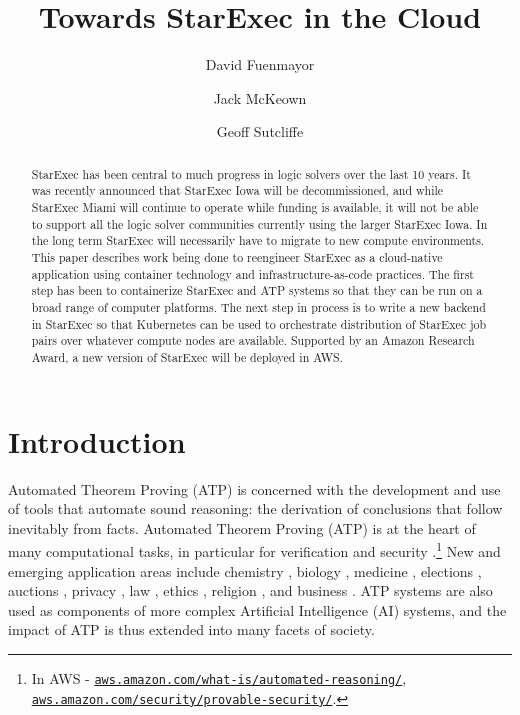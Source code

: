 \documentclass{easychair}
\title{Towards StarExec in the Cloud}
\author{
  David Fuenmayor\inst{1}
\and
  Jack McKeown\inst{2}
\and
  Geoff Sutcliffe\inst{2}
}
\institute{
  University of Bamberg,
  Bamberg, Germany\\
  \email{david.fuenmayor@uni-bamberg.de}
\and
  University of Miami,
  Miami, USA\\
  \email{jam771@miami.edu,geoff@cs.miami.edu}
}
\begin{document}
\maketitle

\begin{abstract}
StarExec has been central to much progress in logic solvers over the last 10 years.
It was recently announced that StarExec Iowa will be decommissioned, and while StarExec Miami 
will continue to operate while funding is available, it will not be able to support all the 
logic solver communities currently using the larger StarExec Iowa. 
In the long term StarExec will necessarily have to migrate to new compute environments.
This paper describes work being done to reengineer StarExec as a cloud-native application using
container technology and infrastructure-as-code practices.
The first step has been to containerize StarExec and ATP systems so that they can be run on a 
broad range of computer platforms. 
The next step in process is to write a new backend in StarExec so that Kubernetes can be used to 
orchestrate distribution of StarExec job pairs over whatever compute nodes are available.
Supported by an Amazon Research Award, a new version of StarExec will be deployed in AWS.
\end{abstract}
\section{Introduction}
\label{Introduction}

Automated Theorem Proving (ATP) is concerned with the development and use of tools that automate 
sound reasoning: the derivation of conclusions that follow inevitably from facts.
Automated Theorem Proving (ATP) is at the heart of many computational tasks, in particular for
verification \cite{Har06,HH19} and security \cite{Coo18}.\footnote{%
In AWS -
\href{https://aws.amazon.com/what-is/automated-reasoning/}{\tt aws.amazon.com/what-is/automated-reasoning/}, 
\href{https://aws.amazon.com/security/provable-security//}{\tt aws.amazon.com/security/provable-security/}.} 
New and emerging application areas include
chemistry \cite{Yad17}, 
biology \cite{CC+13}, 
medicine \cite{HLB05},
elections \cite{Nip09,BDS17}, 
auctions \cite{CK+15}, 
privacy \cite{Lib20},
law \cite{PS15}, 
ethics \cite{DF+16}, 
religion \cite{OZ11,BW14-ECAI,Hor19},
and business \cite{Han98}.
ATP systems are also used as components of more complex Artificial Intelligence (AI) systems,
and the impact of ATP is thus extended into many facets of society.
\end{document}
